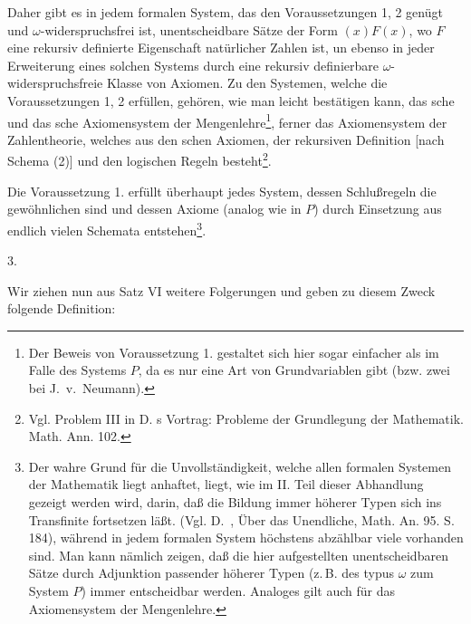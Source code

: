 \documentclass[draft]{scrartcl}
\begin{document}
Daher gibt es in jedem formalen System, das den Voraussetzungen 1, 2 genügt
und $\omega$-widerspruchsfrei ist, unentscheidbare Sätze der Form 
$\left(x\right)F\left(x\right)$, wo $F$ eine rekursiv definierte Eigenschaft 
natürlicher Zahlen ist, un ebenso in jeder Erweiterung eines solchen Systems 
durch eine rekursiv definierbare $\omega$-widerspruchsfreie Klasse von Axiomen.
Zu den Systemen, welche die Voraussetzungen 1, 2 erfüllen, gehören, wie man leicht 
bestätigen kann, das sche und das sche Axiomensystem
der Mengenlehre\footnote{Der Beweis von Voraussetzung 1. gestaltet sich hier sogar einfacher 
als im Falle des Systems $P$, da es nur eine Art von Grundvariablen gibt (bzw. zwei bei J.~v.~Neumann).},
ferner das Axiomensystem der Zahlentheorie, welches aus
den schen Axiomen, der rekursiven Definition [nach Schema (2)] 
und den logischen Regeln besteht\footnote{Vgl. Problem III in D. s Vortrag: 
Probleme der Grundlegung der Mathematik. Math. Ann. 102.}.

\let\originalfootnote=\thefootnote
\let\thefootnote=\fnachtundvierziga
Die Voraussetzung 1. erfüllt überhaupt jedes System, dessen Schlußregeln die gewöhnlichen sind und dessen Axiome (analog wie in $P$) durch Einsetzung aus endlich vielen Schemata 
entstehen\footnote{Der wahre Grund für die
Unvollständigkeit, welche allen formalen Systemen 
der Mathematik liegt anhaftet, liegt, wie im II. 
Teil dieser Abhandlung gezeigt werden wird, darin,
daß die Bildung immer höherer Typen sich ins 
Transfinite fortsetzen läßt. (Vgl. D.~, 
Über das Unendliche, Math. An. 95. S. 184), während 
in jedem formalen System höchstens abzählbar viele
vorhanden sind. Man kann nämlich zeigen, daß die hier
aufgestellten unentscheidbaren Sätze durch Adjunktion
passender höherer Typen (z.\,B. des typus $\omega$ zum
System $P$) immer entscheidbar werden. Analoges gilt auch 
für das Axiomensystem der Mengenlehre.}.
\let\thefootnote=\originalfootnote
\setcounter{footnote}{48}

\begin{center}
3.
\end{center}

Wir ziehen nun aus Satz VI weitere Folgerungen und geben zu diesem Zweck folgende Definition:
\end{document}
